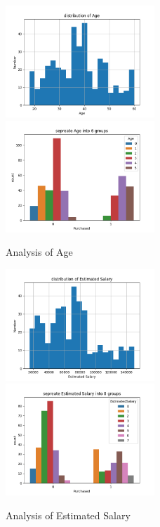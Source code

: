 \begin{figure}[htbp]
  \includegraphics[width=0.5\textwidth]{./image/age_distribution.png}
  \includegraphics[width=0.5\textwidth]{./image/seperated_age.png}
  \caption{Analysis of Age}  
\label{fig:age}
\end{figure}

\begin{figure}[htbp]
  \includegraphics[width=0.5\textwidth]{./image/salary_distribution.png}
  \includegraphics[width=0.5\textwidth]{./image/seperated_salary.png}
  \caption{Analysis of Estimated Salary}  
\label{fig:salary}
\end{figure}

